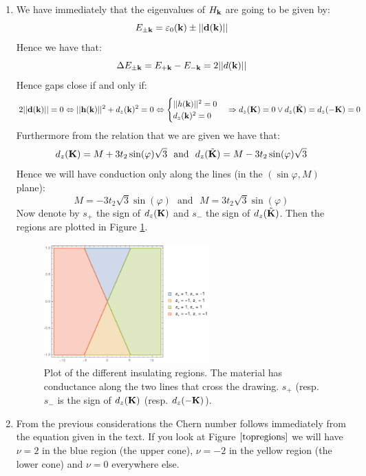 \documentclass[10pt,a4paper]{article}
\begin{document}
\begin{enumerate}
\item We have immediately that the eigenvalues of $H_{\vb{k}}$ are going to be given by:
\[
E_{\pm\vb{k}} = \varepsilon_0(\vb{k}) \pm ||\vb{d}(\vb{k})||
\]
Hence we have that:
\[
\Delta E_{\pm \vb{k}} = E_{+\vb{k}} - E_{-\vb{k}} = 2 ||d(\vb{k})||
\]
Hence gaps close if and only if:
\[
2||\vb{d}(\vb{k})|| = 0 \Leftrightarrow ||\vb{h}(\vb{k})||^2 + d_z(\vb{k})^2 = 0 \Leftrightarrow \begin{cases}
||h(\vb{k})||^2 = 0\\
d_z(\vb{k})^2 = 0
\end{cases} \Rightarrow d_z(\vb{K}) = 0 \lor d_z(\tilde{\vb{K}}) = d_z(-\vb{K}) = 0
\]
Furthermore from the relation that we are given we have that:
\[
d_z(\vb{K}) = M + 3 t_2 \sin(\varphi)\sqrt{3} \mbox{~~and~~} d_z(\tilde{\vb{K}}) = M - 3 t_2 \sin(\varphi) \sqrt{3}
\]
Hence we will have conduction only along the lines (in the $(\sin\varphi, M)$ plane):
\[
M = - 3 t_2 \sqrt{3} \sin(\varphi) \mbox{~~and~~} M = 3 t_2 \sqrt{3} \sin(\varphi)
\]
Now denote by $s_+$ the sign of $d_z(\vb{K})$ and $s_-$ the sign of $d_z(\tilde{\vb{K}})$. Then the regions are plotted in Figure \ref{topregions}.

\begin{figure}
\centering
\includegraphics[width = 0.6\textwidth]{topregions}
\caption{Plot of the different insulating regions. The material has conductance along the two lines that cross the drawing. $s_+$ (resp. $s_-$ is the sign of $d_z(\vb{K})$ (resp. $d_z(-\vb{K})$).} \label{topregions}
\end{figure}

\item From the previous considerations the Chern number follows immediately from the equation given in the text. If you look at Figure $\ref{topregions}$ we will have $\nu = 2$ in the blue region (the upper cone), $\nu = -2$ in the yellow region (the lower cone) and $\nu = 0$ everywhere else.


\end{enumerate}
\end{document}
